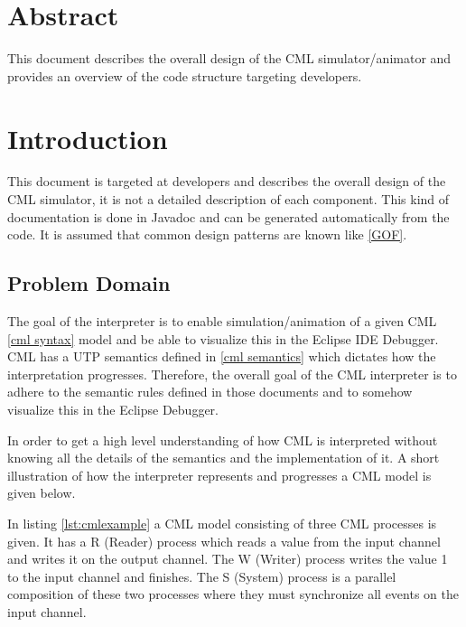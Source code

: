 \documentclass[a4paper, 10pt]{include/compassreport}   %
\begin{document}
\maketitle


\section*{Abstract}
\label{sec:abstract}

This document describes the overall design of the CML
simulator/animator and provides an overview of the code structure
targeting developers.

\newpage

\tableofcontents
\newpage

\section{Introduction}\label{sec:introduction}
This document is targeted at developers and describes the overall
design of the CML simulator, it is not a detailed description of each
component. This kind of documentation is done in Javadoc and can be
generated automatically from the code. It is assumed that common
design patterns are known like \ref{GOF}.

\subsection{Problem Domain}
The goal of the interpreter is to enable simulation/animation of a
given CML \ref{cml syntax} model and be able to visualize this in the
Eclipse IDE Debugger. CML has a UTP semantics defined in \ref{cml
semantics} which dictates how the interpretation progresses. Therefore, the
overall goal of the CML interpreter is to adhere to the semantic
rules defined in those documents and to somehow visualize this in the
Eclipse Debugger.

In order to get a high level understanding of how CML is interpreted
without knowing all the details of the semantics and the
implementation of it. A short illustration of how the interpreter
represents and progresses a CML model is given below. 

In listing \ref{lst:cmlexample} a CML model consisting of three CML
processes is given. It has a R (Reader) process which reads a value from
the input channel and writes it on the output channel. The W (Writer)
process writes the value 1 to the input channel and finishes. The
S (System) process is a parallel composition of these two processes where
they must synchronize all events on the input channel.
\end{document}
